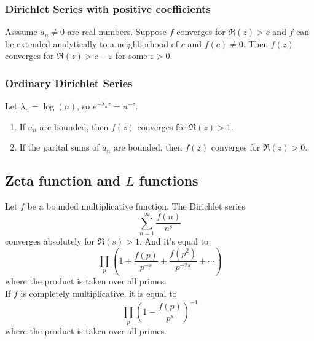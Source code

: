 \documentclass[15pt]{scrartcl}
\begin{document}
\subsubsection*{Dirichlet Series with positive coefficients}
\begin{proposition}\label{prop:6.10}
    Asssume $a_n\neq 0$ are real numbers. Suppose $f$ converges for $\Re(z)>c$ and $f$ can be extended analytically to a neighborhood of $c$ and $f(c)\neq 0$. Then $f(z)$ converges for $\Re(z)>c-\varepsilon$ for some $\varepsilon>0$.
\end{proposition}
\subsubsection*{Ordinary Dirichlet Series}

\begin{proposition}
    Let $\lambda_n=\log(n)$, so $e^{-\lambda_n z}=n^{-z}$.
    \begin{enumerate}
        \item If $a_n$ are bounded, then $f(z)$ converges for $\Re(z)>1$.
        \item If the parital sums of $a_n$ are bounded, then $f(z)$ converges for $\Re(z)>0$.
    \end{enumerate}
\end{proposition}
\subsection{Zeta function and $L$ functions}
\begin{lemma}
    Let $f$ be a bounded multiplicative function. The Dirichlet series 
    \[\sum_{n=1}^\infty \frac{f(n)}{n^s}\] converges absolutely for $\Re(s)>1$. And it's equal to \[\prod_p\left(1+\frac{f(p)}{p^{-s}}+\frac{f(p^2)}{p^{-2s}}+\cdots\right)\]where the product is taken over all primes.
    \\

    If $f$ is completely multiplicative, it is equal to \[\prod_p\left(1-\frac{f(p)}{p^s}\right)^{-1}\] where the product is taken over all primes.
\end{lemma}
\end{document}
